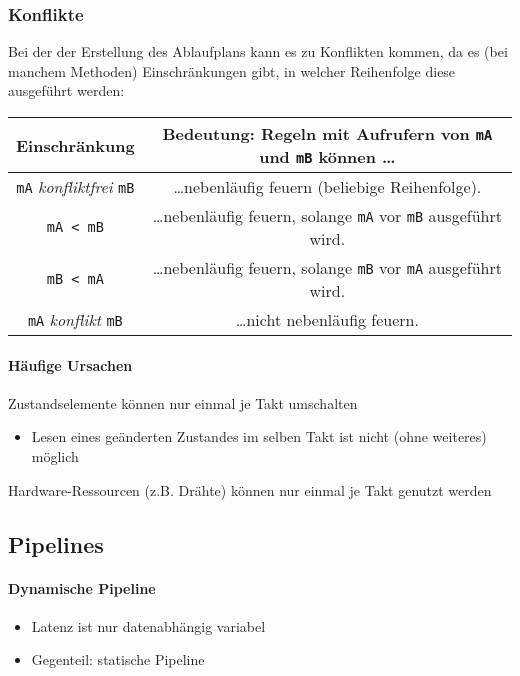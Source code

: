 \documentclass[a4paper, 11pt, accentcolor = tud3b]{tudreport}
\begin{document}
				\subsubsection{Konflikte}
					Bei der der Erstellung des Ablaufplans kann es zu Konflikten kommen, da es (bei manchem Methoden) Einschränkungen gibt, in welcher Reihenfolge diese ausgeführt werden:
					\begin{table}[ht]
						\centering
						\begin{tabular}{c c}
							Einschränkung & Bedeutung: Regeln mit Aufrufern von \texttt{mA} und \texttt{mB} können \dots \\
							\hline
							\texttt{mA} \textit{konfliktfrei} \texttt{mB} & \dots nebenläufig feuern (beliebige Reihenfolge). \\
							\texttt{mA < mB} & \dots nebenläufig feuern, solange \texttt{mA} vor \texttt{mB} ausgeführt wird. \\
							\texttt{mB < mA} & \dots nebenläufig feuern, solange \texttt{mB} vor \texttt{mA} ausgeführt wird. \\
							\texttt{mA} \textit{konflikt} \texttt{mB} & \dots nicht nebenläufig feuern. \\
						\end{tabular}
					\end{table}
					
					\paragraph{Häufige Ursachen}
						\begin{description}[leftmargin = 5cm]
							\item[Rule Ordering Conflict] Zustandselemente können nur einmal je Takt umschalten
								\begin{itemize}
									\item Lesen eines geänderten Zustandes im selben Takt ist nicht (ohne weiteres) möglich
								\end{itemize}
							\item[Rule Resource Conflict] Hardware-Ressourcen (z.B. Drähte) können nur einmal je Takt genutzt werden
						\end{description}
			
			\subsection{Pipelines}
				\paragraph{Dynamische Pipeline}
					\begin{itemize}
						\item Latenz ist nur datenabhängig variabel
						\item Gegenteil: statische Pipeline
					\end{itemize}
				
\end{document}
